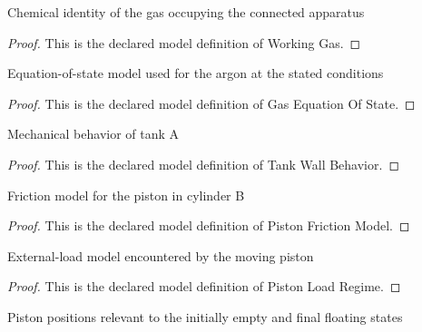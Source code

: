 \begin{definition}
  \label{def:physics:phyx-mini-0449:phyxminiproblems-problemphyxmini0449-workinggas}
  Chemical identity of the gas occupying the connected apparatus
\end{definition}
\begin{proof}
  This is the declared model definition of Working Gas.
\end{proof}
\begin{definition}
  \label{def:physics:phyx-mini-0449:phyxminiproblems-problemphyxmini0449-gasequationofstate}
  Equation-of-state model used for the argon at the stated conditions
\end{definition}
\begin{proof}
  This is the declared model definition of Gas Equation Of State.
\end{proof}
\begin{definition}
  \label{def:physics:phyx-mini-0449:phyxminiproblems-problemphyxmini0449-tankwallbehavior}
  Mechanical behavior of tank A
\end{definition}
\begin{proof}
  This is the declared model definition of Tank Wall Behavior.
\end{proof}
\begin{definition}
  \label{def:physics:phyx-mini-0449:phyxminiproblems-problemphyxmini0449-pistonfrictionmodel}
  Friction model for the piston in cylinder B
\end{definition}
\begin{proof}
  This is the declared model definition of Piston Friction Model.
\end{proof}
\begin{definition}
  \label{def:physics:phyx-mini-0449:phyxminiproblems-problemphyxmini0449-pistonloadregime}
  External-load model encountered by the moving piston
\end{definition}
\begin{proof}
  This is the declared model definition of Piston Load Regime.
\end{proof}
\begin{definition}
  \label{def:physics:phyx-mini-0449:phyxminiproblems-problemphyxmini0449-pistonstate}
  Piston positions relevant to the initially empty and final floating states
\end{definition}
